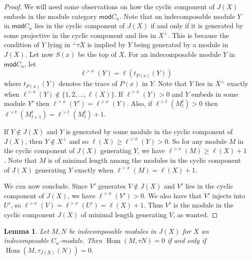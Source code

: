\documentclass[11pt]{amsart}
\newcommand{\mods}{\mathsf{mod}}
\DeclareMathOperator{\Hom}{\mathrm{Hom}}
\newtheorem{lemma}[theorem]{Lemma}
\theoremstyle{definition}
\begin{document}
\begin{proof}
    We will need some observations on how the cyclic component of $J(X)$ embeds in the module category $\mods C_n$. Note that an indecomposable module $Y$ in $\mods C_n$ lies in the cyclic component of $J(X)$ if and only if it is generated by some projective in the cyclic component and lies in $X^\perp$. This is because the condition of $Y$ lying in ${}^\perp \tau X$ is implied by $Y$ being generated by a module in $J(X)$. Let now $S(x)$ be the top of $X$. For an indecomposable module $Y$ in $\mods C_n$, let \[\ell^{>x}(Y) = \ell(t_{P(x)}(Y))\] where $t_{P(x)}(Y)$ denotes the trace of $P(x)$ in $Y$. Note that $Y$ lies in $X^\perp$ exactly when $\ell^{>x}(Y) \notin \{1,2,\dots,\ell(X)\}$. If $\ell^{>x}(Y) > 0$ and $Y$ embeds in some module $Y'$ then $\ell^{>x}(Y') = \ell^{>x}(Y)$. Also, if $\ell^{>t}(M^t_l) > 0$ then $\ell^{>t}(M^t_{l+1}) = \ell^{>t}(M^t_l)+1$.

    If $Y \notin J(X)$ and $Y$ is generated by some module in the cyclic component of $J(X)$, then $Y \notin X^\perp$ and so $\ell(X) \geq \ell^{>x}(Y) > 0$. So for any module $M$ in the cyclic component of $J(X)$ generating $Y$, we have $\ell^{>x}(M) \geq \ell(X)+1$. Note that $M$ is of minimal length among the modules in the cyclic component of $J(X)$ generating $Y$ exactly when $\ell^{>x}(M) = \ell(X)+1$.

    We can now conclude. Since $V'$ generates $V \notin J(X)$ and $V'$ lies in the cyclic component of $J(X)$, we have $\ell^{>x}(V') > 0$. We also have that $V'$ injects into $U'$, so $\ell^{>x}(V) = \ell^{>x}(U') = \ell(X) +1$. Thus $V'$ is the module in the cyclic component $J(X)$ of minimal length generating $V$, as wanted.
\end{proof}


\begin{lemma}\label{lem:tau_rigid_in_J(x)_iff_tau_rigid}
    Let $M,N$ be indecomposable modules in $J(X)$ for $X$ an indecomposable $C_n$-module. Then $\Hom(M,\tau N) = 0$ if and only if $\Hom(M,\tau_{J(X)}(N)) = 0$.
\end{lemma}
\end{document}
